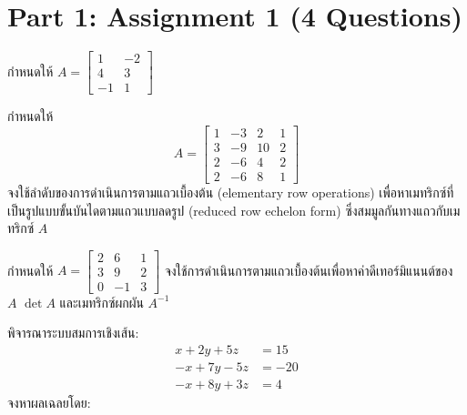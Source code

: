 ﻿\documentclass[12pt, a4paper]{exam}
\begin{document}
\section*{Part 1: Assignment 1 (4 Questions)}
\begin{questions}

\question กำหนดให้ $A = \begin{bmatrix} 1 & -2 \\ 4 & 3 \\ -1 & 1 \end{bmatrix}$
\vspace{3cm}

\question กำหนดให้
\[
A = \begin{bmatrix} 1 & -3 & 2 & 1 \\ 3 & -9 & 10 & 2 \\ 2 & -6 & 4 & 2 \\ 2 & -6 & 8 & 1 \end{bmatrix}
\]
จงใช้ลำดับของการดำเนินการตามแถวเบื้องต้น (elementary row operations) เพื่อหาเมทริกซ์ที่เป็นรูปแบบขั้นบันไดตามแถวแบบลดรูป (reduced row echelon form) ซึ่งสมมูลกันทางแถวกับเมทริกซ์ $A$
\vspace{5cm}

\question กำหนดให้ $A = \begin{bmatrix} 2 & 6 & 1 \\ 3 & 9 & 2 \\ 0 & -1 & 3 \end{bmatrix}$ จงใช้การดำเนินการตามแถวเบื้องต้นเพื่อหาค่าดีเทอร์มิแนนต์ของ $A$ $\det A$ และเมทริกซ์ผกผัน $A^{-1}$
\vspace{5cm}

\question พิจารณาระบบสมการเชิงเส้น:
\[
\begin{aligned}
x + 2y + 5z &= 15 \\
-x + 7y - 5z &= -20 \\
-x + 8y + 3z &= 4
\end{aligned}
\]
จงหาผลเฉลยโดย:
\vspace{5cm}

\end{questions}
\end{document}

